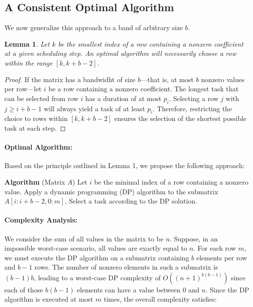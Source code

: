 \documentclass{article}
\newtheorem{lemma}{Lemma}
\begin{document}
\subsection{A Consistent Optimal Algorithm}\label{band-consistent-algo}

We now generalize this approach to a band of arbitrary size $b$.

\begin{lemma}\label{lemma:rowforDP}
Let $k$ be the smallest index of a row containing a nonzero coefficient at a given scheduling step. An optimal algorithm will necessarily choose a row within the range $[k, k + b - 2]$.
\end{lemma}

\begin{proof}
If the matrix has a bandwidht of size $b$—that is, at most $b$ nonzero values per row—let $i$ be a row containing a nonzero coefficient. The longest task that can be selected from row $i$ has a duration of at most $p_i$. Selecting a row $j$ with $j \geq i + b - 1$ will always yield a task of at least $p_i$. Therefore, restricting the choice to rows within $[k, k + b - 2]$ ensures the selection of the shortest possible task at each step.
\end{proof}

\paragraph{Optimal Algorithm:} Based on the principle outlined in Lemma 1, we propose the following approach:

\begin{algorithmic}
\State \textbf{Algorithm} (Matrix $A$)
\State Let $i$ be the minimal index of a row containing a nonzero value.
\State Apply a dynamic programming (DP) algorithm to the submatrix $A[i : i + b - 2, 0:m]$.
\State Select a task according to the DP solution.
\EndWhile
\EndWhile
\end{algorithmic}

\paragraph{Complexity Analysis:}
We consider the sum of all values in the matrix to be $n$. Suppose, in an impossible  worst-case scenario, all values are exactly equal to $n$. For each row $m$, we must execute the DP algorithm on a submatrix containing $b$ elements per row and $b-1$ rows. The number of nonzero elements in such a submatrix is $(b-1)b$, leading to a worst-case DP complexity of $O((n+1)^{b(b-1)})$ since each of those $b(b-1)$ elements can have a value between $0$ and $n$. Since the DP algorithm is executed at most $m$ times, the overall complexity satisfies:
\end{document}
